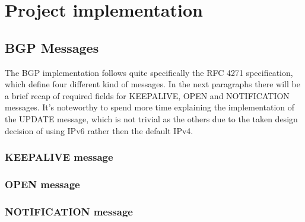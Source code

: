 \chapter{Project implementation}

\section{BGP Messages}
The BGP implementation follows quite specifically the RFC 4271 specification, which define four different kind of messages.
In the next paragraphs there will be a brief recap of required fields for KEEPALIVE, OPEN and NOTIFICATION messages. It's noteworthy to spend more time explaining the implementation of the UPDATE message, which is not trivial as the others due to the taken design decision of using IPv6 rather then the default IPv4.


\subsection{KEEPALIVE message}



\subsection{OPEN message}



\subsection{NOTIFICATION message}


